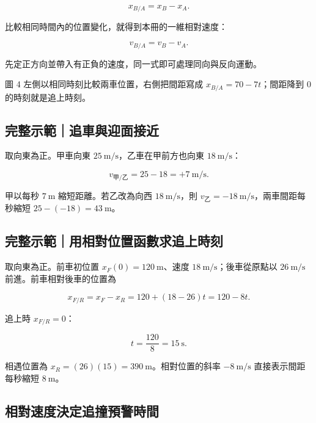 \documentclass[11pt,a4paper]{article}
\begin{document}
\[
x_{B/A}=x_B-x_A.
\]

比較相同時間內的位置變化，就得到本冊的一維相對速度：

\[
\boxed{v_{B/A}=v_B-v_A}.
\]

先定正方向並帶入有正負的速度，同一式即可處理同向與反向運動。

圖 4 左側以相同時刻比較兩車位置，右側把間距寫成 \(x_{B/A}=70-7t\)；間距降到 0 的時刻就是追上時刻。

\begin{HandoutWorkedExample}

\subsection{完整示範｜追車與迎面接近}\label{ux5b8cux6574ux793aux7bc4ux8ffdux8ecaux8207ux8fceux9762ux63a5ux8fd1}

取向東為正。甲車向東 \(25\ \mathrm{m/s}\)，乙車在甲前方也向東 \(18\ \mathrm{m/s}\)：

\[
v_{\text{甲/乙}}=25-18=+7\ \mathrm{m/s}.
\]

甲以每秒 \(7\ \mathrm{m}\) 縮短距離。若乙改為向西 \(18\ \mathrm{m/s}\)，則 \(v_\text{乙}=-18\ \mathrm{m/s}\)，兩車間距每秒縮短 \(25-(-18)=43\ \mathrm{m}\)。

\end{HandoutWorkedExample}

\begin{HandoutWorkedExample}

\subsection{完整示範｜用相對位置函數求追上時刻}\label{ux5b8cux6574ux793aux7bc4ux7528ux76f8ux5c0dux4f4dux7f6eux51fdux6578ux6c42ux8ffdux4e0aux6642ux523b}

取向東為正。前車初位置 \(x_F(0)=120\ \mathrm m\)、速度 \(18\ \mathrm{m/s}\)；後車從原點以 \(26\ \mathrm{m/s}\) 前進。前車相對後車的位置為

\[
x_{F/R}=x_F-x_R=120+(18-26)t=120-8t.
\]

追上時 \(x_{F/R}=0\)：

\[
t=\frac{120}{8}=15\ \mathrm s.
\]

相遇位置為 \(x_R=(26)(15)=390\ \mathrm m\)。相對位置的斜率 \(-8\ \mathrm{m/s}\) 直接表示間距每秒縮短 \(8\ \mathrm m\)。

\end{HandoutWorkedExample}

\subsection{相對速度決定追撞預警時間}\label{ux76f8ux5c0dux901fux5ea6ux6c7aux5b9aux8ffdux649eux9810ux8b66ux6642ux9593}
\end{document}
